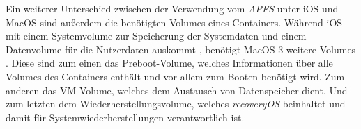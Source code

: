 Ein weiterer Unterschied zwischen der Verwendung vom \textit{APFS} unter iOS und
MacOS sind außerdem die benötigten Volumes eines Containers.  Während iOS mit
einem Systemvolume zur Speicherung der Systemdaten und einem Datenvolume für
die Nutzerdaten auskommt \cite[S. 49]{apple2020}, benötigt MacOS 3 weitere
Volumes \cite[S. 48]{apple2020}. Diese sind zum einen das Preboot-Volume,
welches Informationen über alle Volumes des Containers enthält und vor allem zum
Booten benötigt wird. Zum anderen das VM-Volume, welches dem Austausch von
Datenspeicher dient. Und zum letzten dem Wiederherstellungsvolume, welches
\textit{recoveryOS} beinhaltet und damit für Systemwiederherstellungen
verantwortlich ist.
